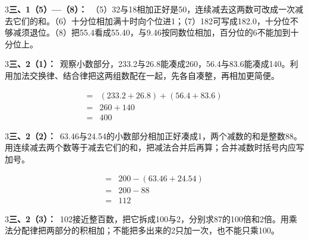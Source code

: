 \documentclass[multi=snippet,border={5bp 20bp 5bp 5bp}]{standalone}
\newenvironment{snippet}[3]{\begin{minipage}{#1bp}\color{answerred}\fontsize{#2}{#3}\selectfont\raggedright}{\end{minipage}}
\begin{document}
\begin{snippet}{505}{11.5}{14}\begin{multicols}{3}\raggedcolumns \textbf{三、1（5）—（8）：}\ （5）32与18相加正好是50，连续减去这两数可改成一次减去它们的和。（6）十分位相加满十时向个位进1；（7）182可写成182.0，十分位不够减须退位。（8）把55.4看成55.40，与9.46按同数位相加，百分位的6不能加到十分位上。\end{multicols}\end{snippet}
\begin{snippet}{505}{11.5}{14}\begin{multicols}{3}\raggedcolumns \textbf{三、2（1）：}\ 观察小数部分，233.2与26.8能凑成260，56.4与83.6能凑成140。利用加法交换律、结合律把这两组数配在一起，先各自凑整，再相加更简便。\end{multicols}\end{snippet}
\begin{snippet}{198.233}{10.5}{12.8}\SourceSans\setlength{\mathindent}{2bp}\[\begin{aligned}={}&(233.2+26.8)+(56.4+83.6)\\={}&260+140\\={}&400\end{aligned}\]\end{snippet}
\begin{snippet}{505}{11.5}{14}\begin{multicols}{3}\raggedcolumns \textbf{三、2（2）：}\ 63.46与24.54的小数部分相加正好凑成1，两个减数的和是整数88。用连续减去两个数等于减去它们的和，把减法合并后再算；合并减数时括号内应写加号。\end{multicols}\end{snippet}
\begin{snippet}{164.567}{10.5}{12.8}\SourceSans\setlength{\mathindent}{2bp}\[\begin{aligned}={}&200-(63.46+24.54)\\={}&200-88\\={}&112\end{aligned}\]\end{snippet}
\begin{snippet}{505}{11.5}{14}\begin{multicols}{3}\raggedcolumns \textbf{三、2（3）：}\ 102接近整百数，把它拆成100与2，分别求87的100倍和2倍。用乘法分配律把两部分的积相加；不能把多出来的2只加一次，也不能只乘100。\end{multicols}\end{snippet}
\end{document}
